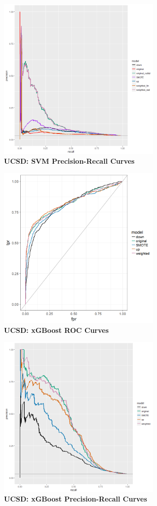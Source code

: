 \documentclass[12pt,]{article}
\begin{document}
\includegraphics[width=0.6\textwidth,height=\textheight]{figures/ucsd/ucsd_svm_PR.png}\\
\textbf{UCSD: SVM Precision-Recall Curves}

\includegraphics[width=0.6\textwidth,height=\textheight]{figures/ucsd/ucsd_xgboost_rocs.png}\\
\textbf{UCSD: xGBoost ROC Curves}

\includegraphics[width=0.6\textwidth,height=\textheight]{figures/ucsd/ucsd_xgboost_PR.png}\\
\textbf{UCSD: xGBoost Precision-Recall Curves}
\end{document}
